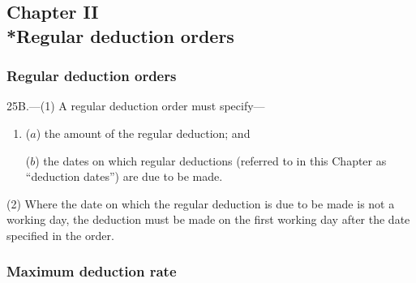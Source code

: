 \documentclass[12pt,a4paper]{article}
\begin{document}

\subsection[Chapter II --- Regular deduction orders]{Chapter II\\*Regular deduction orders}

\renewcommand\parthead{--- Part IIIA Chapter II}

\subsubsection[25B. Regular deduction orders]{Regular deduction orders}

25B.---(1)  A regular deduction order must specify—
\begin{enumerate}\item[]
($a$) the amount of the regular deduction; and

($b$) the dates on which regular deductions (referred to in this Chapter as “deduction dates”) are due to be made.
\end{enumerate}

(2) Where the date on which the regular deduction is due to be made is not a working day, the deduction must be made on the first working day after the date specified in the order.

\subsubsection[25C. Maximum deduction rate]{Maximum deduction rate}
\end{document}
